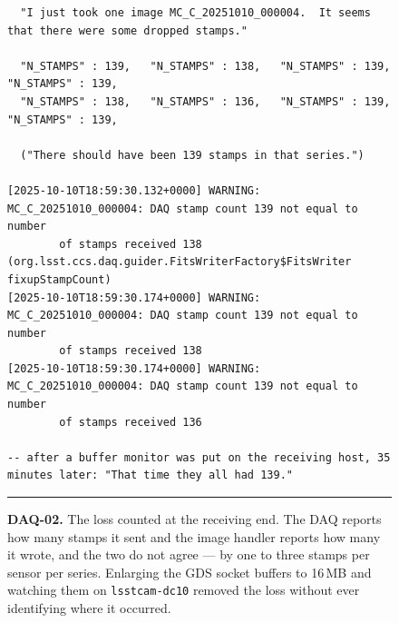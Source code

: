 \begin{description}
\begin{figure}[H]
\begin{minipage}{\textwidth}
\begin{verbatim}
  "I just took one image MC_C_20251010_000004.  It seems that there were some dropped stamps."

  "N_STAMPS" : 139,   "N_STAMPS" : 138,   "N_STAMPS" : 139,   "N_STAMPS" : 139,
  "N_STAMPS" : 138,   "N_STAMPS" : 136,   "N_STAMPS" : 139,   "N_STAMPS" : 139,

  ("There should have been 139 stamps in that series.")

[2025-10-10T18:59:30.132+0000] WARNING: MC_C_20251010_000004: DAQ stamp count 139 not equal to number
        of stamps received 138 (org.lsst.ccs.daq.guider.FitsWriterFactory$FitsWriter fixupStampCount)
[2025-10-10T18:59:30.174+0000] WARNING: MC_C_20251010_000004: DAQ stamp count 139 not equal to number
        of stamps received 138
[2025-10-10T18:59:30.174+0000] WARNING: MC_C_20251010_000004: DAQ stamp count 139 not equal to number
        of stamps received 136

-- after a buffer monitor was put on the receiving host, 35 minutes later: "That time they all had 139."
\end{verbatim}
\endgroup
\vspace{-10pt}\hrule
\end{minipage}
\caption{\textbf{DAQ-02.} The loss counted at the receiving end.  The DAQ reports how many stamps it sent and the image handler reports how many it wrote, and the two do not agree --- by one to three stamps per sensor per series.  Enlarging the GDS socket buffers to 16\,MB and watching them on \texttt{lsstcam-dc10} removed the loss without ever identifying where it occurred.}
\label{fig:iss-DAQ-02}
\end{figure}

\end{description}

